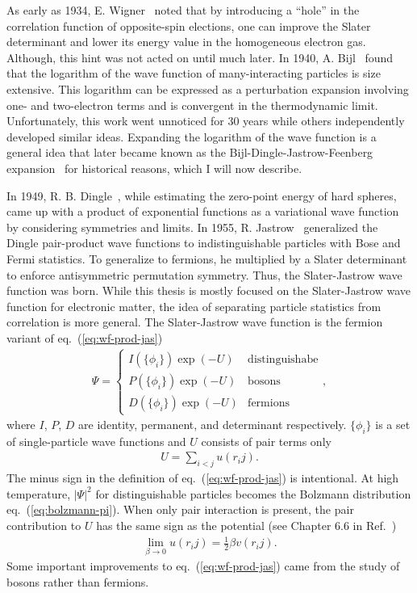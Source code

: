 As early as 1934, E. Wigner~\cite{Wigner1934} noted that by introducing a “hole” in the correlation function of opposite-spin elections, one can improve the Slater determinant and lower its energy value in the homogeneous electron gas. Although, this hint was not acted on until much later.
In 1940, A. Bijl~\cite{Bijl1940} found that the logarithm of the wave function of many-interacting particles is size extensive. This logarithm can be expressed as a perturbation expansion involving one- and two-electron terms and is convergent in the thermodynamic limit.
Unfortunately, this work went unnoticed for 30 years while others independently developed similar ideas. Expanding the logarithm of the wave function is a general idea that later became known as the Bijl-Dingle-Jastrow-Feenberg expansion~\cite{Carleo2017} for historical reasons, which I will now describe.

In 1949, R. B. Dingle~\cite{Dingle1949}, while estimating the zero-point energy of hard spheres, came up with a product of exponential functions as a variational wave function by considering symmetries and limits. In 1955, R. Jastrow~\cite{Jastrow1955} generalized the Dingle pair-product wave functions to indistinguishable particles with Bose and Fermi statistics. To generalize to fermions, he multiplied by a Slater determinant to enforce antisymmetric permutation symmetry. Thus, the Slater-Jastrow wave function was born. While this thesis is mostly focused on the Slater-Jastrow wave function for electronic matter, the idea of separating particle statistics from correlation is more general. The Slater-Jastrow wave function is the fermion variant of eq.~(\ref{eq:wf-prod-jas})
\begin{align} \label{eq:wf-prod-jas}
\Psi = \left\{\begin{array}{ll}
I(\{\phi_i\}) \exp(-U) & \text{distinguishabe} \\
P(\{\phi_i\}) \exp(-U) & \text{bosons} \\
D(\{\phi_i\}) \exp(-U) & \text{fermions}
\end{array}\right.,
\end{align}
where $I$, $P$, $D$ are identity, permanent, and determinant respectively.
$\{\phi_i\}$ is a set of single-particle wave functions and $U$ consists of pair terms only
\begin{align} \label{eq:wf-pair-jas}
U = \sum\limits_{i<j} u(r_ij).
\end{align}
The minus sign in the definition of eq.~(\ref{eq:wf-prod-jas}) is intentional.
At high temperature, $\vert\Psi\vert^2$ for distinguishable particles becomes the Bolzmann distribution eq.~(\ref{eq:bolzmann-pi}). When only pair interaction is present, the pair contribution to $U$ has the same sign as the potential (see Chapter 6.6 in Ref.~\cite{Martin2016})
\begin{align}
\lim\limits_{\beta\rightarrow 0} u(r_ij) = \frac{1}{2}\beta v(r_ij).
\end{align}
Some important improvements to eq.~(\ref{eq:wf-prod-jas}) came from the study of bosons rather than fermions.

